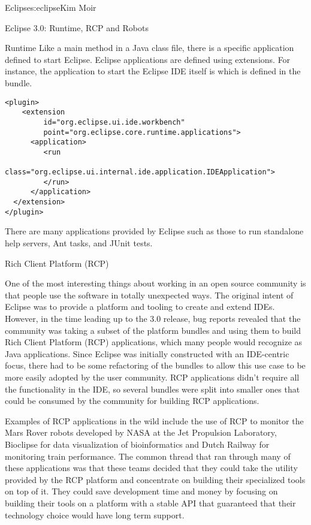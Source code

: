 \begin{aosachapter}{Eclipse}{s:eclipse}{Kim Moir}
\begin{aosasect1}{Eclipse 3.0: Runtime, RCP and Robots}
\begin{aosasect2}{Runtime}
Like a main method in a Java class file, there is a specific
application defined to start Eclipse. Eclipse applications are defined
using extensions. For instance, the application to start the Eclipse
IDE itself is  which is defined in the
 bundle.

\begin{verbatim}
<plugin>
    <extension
         id="org.eclipse.ui.ide.workbench"
         point="org.eclipse.core.runtime.applications">
      <application>
         <run
               class="org.eclipse.ui.internal.ide.application.IDEApplication">
         </run>
      </application>
  </extension>
</plugin>
\end{verbatim}

There are many applications provided by Eclipse such as those to run
standalone help servers, Ant tasks, and JUnit tests.

\end{aosasect2}

\begin{aosasect2}{Rich Client Platform (RCP)}

One of the most interesting things about working in an open source
community is that people use the software in totally unexpected ways.
The original intent of Eclipse was to provide a platform and tooling
to create and extend IDEs.  However, in the time leading up to the 3.0
release, bug reports revealed that the community was taking a subset
of the platform bundles and using them to build Rich Client Platform
(RCP) applications, which many people would recognize as Java applications.  Since Eclipse was initially constructed with an
IDE-centric focus, there had to be some refactoring of the bundles to
allow this use case to be more easily adopted by the user
community. RCP applications didn't require all the functionality in
the IDE, so several bundles were split into smaller ones that could be
consumed by the community for building RCP applications.  

Examples of RCP applications in the wild include the use of RCP to monitor the
Mars Rover robots developed by NASA at the Jet Propulsion Laboratory,
Bioclipse for data visualization of bioinformatics and Dutch Railway
for monitoring train performance.  The common thread that ran through
many of these applications was that these teams decided that they
could take the utility provided by the RCP platform and concentrate on
building their specialized tools on top of it. They could save
development time and money by focusing on building their tools on a
platform with a stable API that guaranteed that their technology
choice would have long term support.


\end{aosasect2}
\end{aosasect1}
\end{aosachapter}
